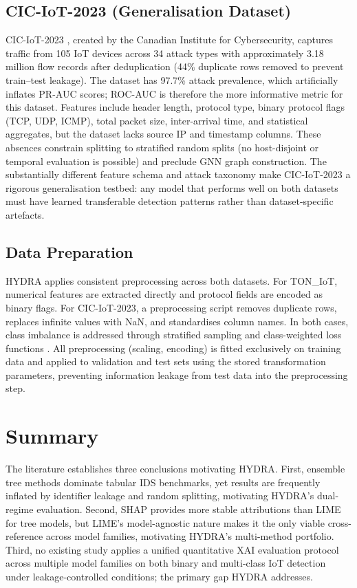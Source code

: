 \documentclass[12pt,a4paper]{report}
\begin{document}
\subsection{CIC-IoT-2023 (Generalisation Dataset)}
\label{sec:ciciot}

CIC-IoT-2023 \cite{cic2023}, created by the Canadian Institute for Cybersecurity, captures traffic from 105 IoT devices across 34 attack types with approximately 3.18 million flow records after deduplication (44\% duplicate rows removed to prevent train--test leakage). The dataset has 97.7\% attack prevalence, which artificially inflates PR-AUC scores; ROC-AUC is therefore the more informative metric for this dataset. Features include header length, protocol type, binary protocol flags (TCP, UDP, ICMP), total packet size, inter-arrival time, and statistical aggregates, but the dataset lacks source IP and timestamp columns. These absences constrain splitting to stratified random splits (no host-disjoint or temporal evaluation is possible) and preclude GNN graph construction. The substantially different feature schema and attack taxonomy make CIC-IoT-2023 a rigorous generalisation testbed: any model that performs well on both datasets must have learned transferable detection patterns rather than dataset-specific artefacts.

\subsection{Data Preparation}
\label{sec:data-prep}

HYDRA applies consistent preprocessing across both datasets. For TON\_IoT, numerical features are extracted directly and protocol fields are encoded as binary flags. For CIC-IoT-2023, a preprocessing script removes duplicate rows, replaces infinite values with NaN, and standardises column names. In both cases, class imbalance is addressed through stratified sampling and class-weighted loss functions \cite{anbiaee2025}. All preprocessing (scaling, encoding) is fitted exclusively on training data and applied to validation and test sets using the stored transformation parameters, preventing information leakage from test data into the preprocessing step.

\section{Summary}
\label{sec:lit-summary}

The literature establishes three conclusions motivating HYDRA. First, ensemble tree methods dominate tabular IDS benchmarks, yet results are frequently inflated by identifier leakage and random splitting, motivating HYDRA's dual-regime evaluation. Second, SHAP provides more stable attributions than LIME for tree models, but LIME's model-agnostic nature makes it the only viable cross-reference across model families, motivating HYDRA's multi-method portfolio. Third, no existing study applies a unified quantitative XAI evaluation protocol across multiple model families on both binary and multi-class IoT detection under leakage-controlled conditions; the primary gap HYDRA addresses.
\end{document}
